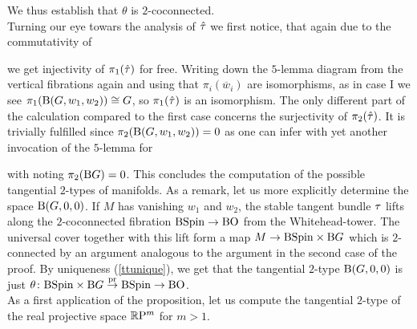     We thus establish that $\theta$ is $2$-coconnected.\\
    Turning our eye towars the analysis of $\hat{\tau}$ we first notice, that again due to the commutativity of 
    \begin{center}
    \end{center}
   we get injectivity of $\pi_1(\hat{\tau})$ for free. 
   Writing down the $5$-lemma diagram from the vertical fibrations again and using that $\pi_i(\overline{w}_i)$ are isomorphisms, as in case I we see $\pi_1(\mathrm{B}(G,w_1,w_2)) \cong G$, so $\pi_1(\hat{\tau})$ is an isomorphism.
   The only different part of the calculation compared to the first case concerns the surjectivity of $\pi_2(\hat{\tau})$.
   It is trivially fulfilled since $\pi_2(\mathrm{B}(G,w_1,w_2)) = 0$ as one can infer with yet another invocation of the $5$-lemma for
    \begin{center}
    \end{center}
    with noting $\pi_2(\mathrm{B} G) = 0$.
    This concludes the computation of the possible tangential $2$-types of manifolds.
\endprf
As a remark, let us more explicitly determine the space $\mathrm{B}(G,0,0)$. 
If $M$ has vanishing $w_1$ and $w_2$, the stable tangent bundle $\tau$ lifts along the $2$-coconnected fibration $\mathrm{BSpin} \to\mathrm{BO}$ from the Whitehead-tower.
The universal cover together with this lift form a map $M\to \mathrm{BSpin} \times \mathrm{B} G$ which is $2$-connected by an argument analogous to the argument in the second case of the proof.
By uniqueness (\ref{ttunique}), we get that the tangential $2$-type $\mathrm{B}(G,0,0)$ is just $\theta\colon \mathrm{BSpin}\times\mathrm{B} G \overset{\mathrm{pr}}{\to} \mathrm{BSpin} \to \mathrm{BO}$.\\
As a first application of the proposition, let us compute the tangential $2$-type of the real projective space $\mathbb{R}\mathrm{P}^m$ for $m>1$.
